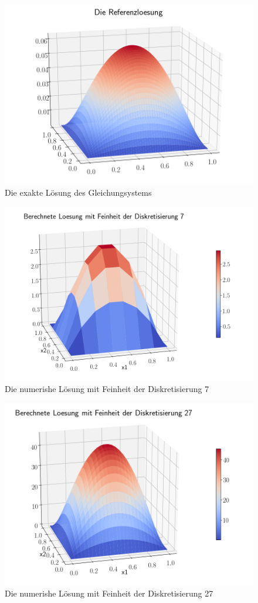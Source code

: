 \documentclass[smallheadings]{scrartcl}
\numberwithin{equation}{section}
\begin{document}
\begin{figure}
	\centering
	\includegraphics[width=0.7\linewidth]{Bericht/Bilder/referenz}
	\caption{Die exakte Lösung des Gleichungsystems}
	\label{fig:referenz}
\end{figure}

\begin{figure}
	\centering
	\includegraphics[width=0.7\linewidth]{Bericht/Bilder/3dlos7}
	\caption{Die numerishe Lösung mit Feinheit der Diskretisierung 7}
	\label{fig:3dlos7}
\end{figure}

\begin{figure}
	\centering
	\includegraphics[width=0.7\linewidth]{Bericht/Bilder/3dlos27}
	\caption{Die numerishe Lösung mit Feinheit der Diskretisierung 27}
	\label{fig:3dlos27}
\end{figure}
\end{document}
